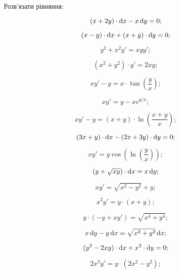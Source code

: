 Розв’язати рівняння:
\begin{multicols}{2}
\begin{problem}
	\[ (x + 2y) \cdot \mathop{}\!\mathrm{d} x - x \mathop{}\!\mathrm{d} y = 0; \]
\end{problem}
\begin{problem}
	\[ (x - y) \cdot \mathop{}\!\mathrm{d} x + (x + y) \cdot \mathop{}\!\mathrm{d} y = 0; \]
\end{problem}
\begin{problem}
	\[y^2 + x^2 y' = x y y'; \]
\end{problem}
\begin{problem}
	\[ (x^2 + y^2) \cdot y' = 2 xy; \]
\end{problem}
\begin{problem}
	\[ xy' - y = x \cdot \tan \left( \frac{y}{x} \right); \]
\end{problem}
\begin{problem}
	\[ x y' = y - x e^{y / x}; \]
\end{problem}
\begin{problem}
	\[x y' - y = (x + y) \cdot \ln \left( \frac{x + y}{x} \right); \]
\end{problem}
\begin{problem}
	\[ (3x + y) \cdot \mathop{}\!\mathrm{d} x - (2x + 3y) \cdot \mathop{}\!\mathrm{d} y = 0; \]
\end{problem}
\begin{problem}
	\[ x y' = y \cos \left(\ln \left(\frac{y}{x} \right)\right); \]
\end{problem}
\begin{problem}
	\[ \left(y+\sqrt{xy}\right)\cdot \mathop{}\!\mathrm{d} x = x \mathop{}\!\mathrm{d} y; \]
\end{problem}
\begin{problem}
	\[ xy' = \sqrt{x^2 - y^2} + y; \]
\end{problem}
\begin{problem}
	\[ x^2 y' = y \cdot (x + y); \]
\end{problem}
\begin{problem}
	\[ y \cdot (-y + xy') = \sqrt{x^4 + y^4}; \]
\end{problem}
\begin{problem}
	\[ x \mathop{}\!\mathrm{d} y - y \mathop{}\!\mathrm{d} x = \sqrt{x^2 + y^2} \mathop{}\!\mathrm{d} x; \]
\end{problem}
\begin{problem}
	\[ (y^2 - 2xy) \cdot \mathop{}\!\mathrm{d} x + x^2 \cdot \mathop{}\!\mathrm{d} y = 0; \]
\end{problem}
\begin{problem}
	\[ 2x^3 y' = y \cdot (2x^2 - y^2); \]
\end{problem}

\end{multicols}

